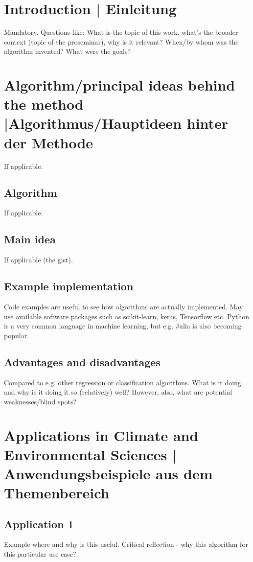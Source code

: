 \section{Introduction | Einleitung}
Mandatory. Questions like: What is the topic of this work, what's the broader context (topic of the proseminar), why is it relevant? When/by whom was the algorithm invented? What were the goals?


\section{Algorithm/principal ideas behind the method |Algorithmus/Hauptideen hinter der Methode}
If applicable.
\subsection{Algorithm}
If applicable.

\subsection{Main idea}
If applicable (the gist). 
\subsection{Example implementation}
Code examples are useful to see how algorithms are actually implemented. May use available software packages such as scikit-learn, keras, Tensorflow etc. Python is a very common language in machine learning, but e.g. Julia is also becoming popular.
\subsection{Advantages and disadvantages}
Compared to e.g. other regression or classification algorithms.
What is it doing and why is it doing it so (relatively) well? However, also, what are potential weaknesses/blind spots?

\section{Applications in Climate and Environmental Sciences | Anwendungsbeispiele aus dem Themenbereich}
\subsection{Application 1}
Example where and why is this useful. Critical reflection - why this algorithm for this particular use case?

